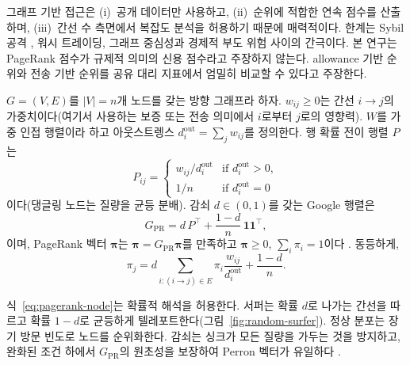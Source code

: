 그래프 기반 접근은 (i)~공개 데이터만 사용하고, (ii)~순위에 적합한 연속 점수를 산출하며, (iii)~간선 수 측면에서 복잡도 분석을 허용하기 때문에 매력적이다. 한계는 Sybil 공격 , 워시 트레이딩, 그래프 중심성과 경제적 부도 위험 사이의 간극이다. 본 연구는 PageRank 점수가 규제적 의미의 신용 점수라고 주장하지 않는다. allowance 기반 순위와 전송 기반 순위를 공유 대리 지표에서 엄밀히 비교할 수 있다고 주장한다.


$G=(V,E)$를 $|V|=n$개 노드를 갖는 방향 그래프라 하자. $w_{ij}\geq 0$는 간선 $i\to j$의 가중치이다(여기서 사용하는 보증 또는 전송 의미에서 $i$로부터 $j$로의 영향력). $W$를 가중 인접 행렬이라 하고 아웃스트렝스 $d_i^{\mathrm{out}}=\sum_j w_{ij}$를 정의한다. 행 확률 전이 행렬 $P$는
\begin{equation}
P_{ij} =
\begin{cases}
w_{ij}/d_i^{\mathrm{out}} & \text{if } d_i^{\mathrm{out}}>0,\\
1/n & \text{if } d_i^{\mathrm{out}}=0
\end{cases}
\label{eq:transition}
\end{equation}
이다(댕글링 노드는 질량을 균등 분배). 감쇠 $d\in(0,1)$를 갖는 Google 행렬은
\begin{equation}
G_{\mathrm{PR}} = d\, P^{\top} + \frac{1-d}{n}\,\mathbf{1}\mathbf{1}^{\top},
\label{eq:google-matrix}
\end{equation}
이며, PageRank 벡터 $\boldsymbol{\pi}$는 $\boldsymbol{\pi}=G_{\mathrm{PR}}\boldsymbol{\pi}$를 만족하고 $\boldsymbol{\pi}\geq 0$, $\sum_i \pi_i=1$이다 . 동등하게,
\begin{equation}
\pi_j = d\sum_{i:(i\to j)\in E}\pi_i \frac{w_{ij}}{d_i^{\mathrm{out}}} + \frac{1-d}{n}.
\label{eq:pagerank-node}
\end{equation}


식~\eqref{eq:pagerank-node}는 확률적 해석을 허용한다. 서퍼는 확률 $d$로 나가는 간선을 따르고 확률 $1-d$로 균등하게 텔레포트한다(그림~\ref{fig:random-surfer}). 정상 분포는 장기 방문 빈도로 노드를 순위화한다. 감쇠는 싱크가 모든 질량을 가두는 것을 방지하고, 완화된 조건 하에서 $G_{\mathrm{PR}}$의 원초성을 보장하여 Perron 벡터가 유일하다 .

